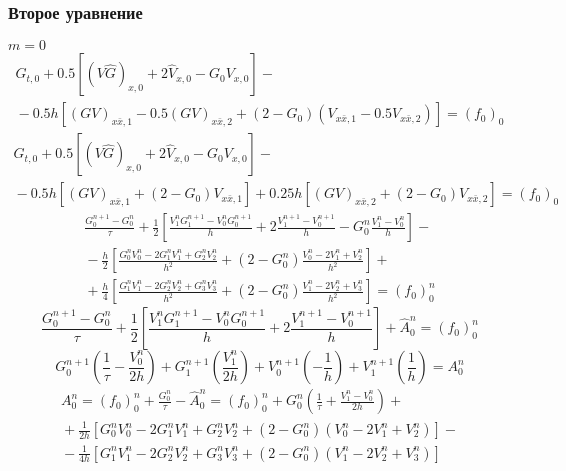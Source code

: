 \subsubsection{Второе уравнение}
$m = 0 $
\begin{multline*}
  G_{t,0} + 0.5 [(V \hat G)_{x,0} + 2 \hat V_{x,0} - G_0 V_{x,0}]
  -{} \\ {}-
  0.5h [
    (GV)_{x \bar x, 1} - 0.5(GV)_{x \bar x, 2} +
    (2 - G_0) (V_{x \bar x, 1} - 0.5V_{x \bar x, 2}) ] = (f_0)_0
\end{multline*}
\begin{multline*}
  G_{t,0} + 0.5 [(V \hat G)_{x,0} + 2 \hat V_{x,0} - G_0 V_{x,0}]
  -{} \\ {}-
  0.5h  [(GV)_{x \bar x, 1} + (2 - G_0) V_{x \bar x, 1}] +
  0.25h [(GV)_{x \bar x, 2} + (2 - G_0) V_{x \bar x, 2}] = (f_0)_0
\end{multline*}
\begin{multline*}
  \frac{G_{0}^{n+1} - G_{0}^{n}}{\tau} 
  + \frac12 \left[
    \frac{V_{1}^{n} G_{1}^{n+1} - V_{0}^{n} G_{0}^{n+1}}{h} 
    + 2 \frac{V_{1}^{n+1} - V_{0}^{n+1}}{h} 
    - G_{0}^{n} \frac{V_{1}^{n} - V_{0}^{n}}{h} 
    \right] -{} \\ {}-
 \frac{h}{2} \left[
    \frac{G_{0}^{n} V_{0}^{n} - 2 G_{1}^{n} V_{1}^{n} + G_{2}^{n} V_{2}^{n}}{h^2} + 
    (2 - G_{0}^{n}) \frac{V_{0}^{n} - 2 V_{1}^{n} + V_{2}^{n}}{h^2}
    \right] +{} \\ {}+
 \frac{h}{4} \left[
    \frac{G_{1}^{n} V_{1}^{n} - 2 G_{2}^{n} V_{2}^{n} + G_{3}^{n} V_{3}^{n}}{h^2} + 
    (2 - G_{0}^{n}) \frac{V_{1}^{n} - 2 V_{2}^{n} + V_{3}^{n}}{h^2}
    \right] = (f_0)_{0}^{n}
\end{multline*}
\begin{equation*}
  \frac{G_{0}^{n+1} - G_{0}^{n}}{\tau} 
  + \frac12 \left[
    \frac{V_{1}^{n} G_{1}^{n+1} - V_{0}^{n} G_{0}^{n+1}}{h} 
    + 2 \frac{V_{1}^{n+1} - V_{0}^{n+1}}{h} \right] 
    + \hat A_{0}^{n} = (f_0)_{0}^{n}
\end{equation*}
\begin{equation*}
  G_{0}^{n+1} \left( \frac{1}{\tau} - \frac{V_{0}^{n}}{2h} \right) +
  G_{1}^{n+1} \left( \frac{V_{1}^{n}}{2h} \right) +
  V_{0}^{n+1} \left(-\frac{1}{h} \right) +
  V_{1}^{n+1} \left( \frac{1}{h} \right)
  = A_{0}^{n}
\end{equation*}
\begin{multline*}
  A_{0}^{n} = (f_0)_{0}^{n} + \frac{G_{0}^{n}}{\tau} - \hat A_{0}^{n} = 
  (f_0)_{0}^{n} + G_{0}^{n} \left( \frac{1}{\tau} + \frac{V_{1}^{n} - V_{0}^{n}}{2h} \right) 
  +{} \\ {}+
  \frac{1}{2h} \left[
    G_{0}^{n} V_{0}^{n} - 2 G_{1}^{n} V_{1}^{n} + G_{2}^{n} V_{2}^{n} + 
    (2 - G_{0}^{n}) (V_{0}^{n} - 2 V_{1}^{n} + V_{2}^{n})
    \right] -{} \\ {}-
  \frac{1}{4h} \left[
    G_{1}^{n} V_{1}^{n} - 2 G_{2}^{n} V_{2}^{n} + G_{3}^{n} V_{3}^{n} + 
    (2 - G_{0}^{n}) (V_{1}^{n} - 2 V_{2}^{n} + V_{3}^{n})
    \right]
\end{multline*}

